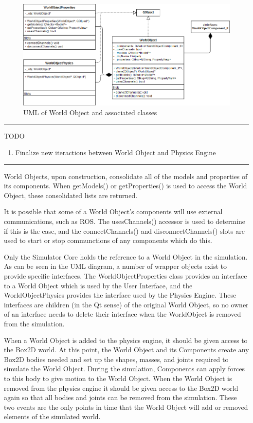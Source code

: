  \begin{figure}[h]
 	\begin{center}
 	\includegraphics[scale=0.5]{./images_design/uml/WorldObj}
 	\caption{UML of World Object and associated classes\label{uml:worldobj}}
 	\end{center}
 \end{figure}
 \hrule	
	TODO
	\begin{enumerate}
		\item Finalize new iteractions between World Object and Physics Engine
	\end{enumerate}
\hrule
	World Objects, upon construction, consolidate all of the models and properties of its components. When getModels() or getProperties() is used to access the World Object, these consolidated lists are returned.
	
	It is possible that some of a World Object's components will use external communications, such as ROS. The usesChannels() accessor is used to determine if this is the case, and the connectChannels() and disconnectChannels() slots are used to start or stop communctions of any components which do this.
	
	Only the Simulator Core holds the reference to a World Object in the simulation. As can be seen in the UML diagram, a number of wrapper objects exist to provide specific interfaces. The WorldObjectProperties class provides an interface to a World Object which is used by the User Interface, and the WorldObjectPhysics provides the interface used by the Physics Engine. These interfaces are children (in the Qt sense) of the original World Object, so no owner of an interface needs to delete their interface when the WorldObject is removed from the simulation.
	
	When a World Object is added to the physics engine, it should be given access to the Box2D world. At this point, the World Object and its Components create any Box2D bodies needed and set up the shapes, masses, and joints required to simulate the World Object. During the simulation, Components can apply forces to this body to give motion to the World Object. When the World Object is removed from the physics engine it should be given access to the Box2D world again so that all bodies and joints can be removed from the simulation. These two events are the only points in time that the World Object will add or removed elements of the simulated world.
  
